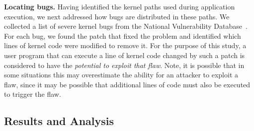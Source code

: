 \textbf{Locating bugs.}
Having identified the kernel paths used during application execution, we next
addressed how bugs are distributed in these paths. We collected a list of
severe kernel bugs from the National Vulnerability Database~\cite{NVD}.
For each bug, we found the patch that fixed the problem and identified
which lines of kernel code were modified to remove it.
For the purpose of this study, a user program that can execute a line of kernel
code changed by such a patch is considered to have the \textit{potential to
exploit that flaw}.  Note, it is possible that in some situations this may
overestimate the ability for an attacker to exploit a flaw, since it may be
possible that additional lines of code must also be executed to trigger the flaw.


\subsection{Results and Analysis}
\label{Verification-of-Hypothesis}


%
%


